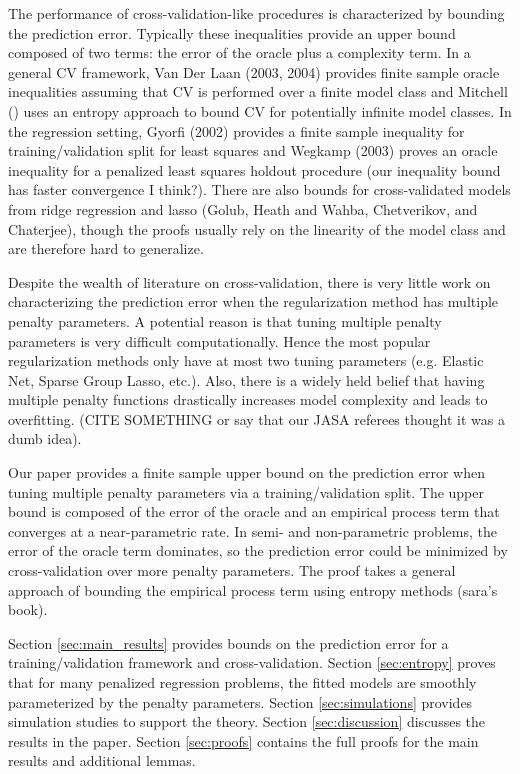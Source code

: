 \documentclass[12pt]{article}
\begin{document}
The performance of cross-validation-like procedures is characterized by bounding the prediction error. Typically these inequalities provide an upper bound composed of two terms: the error of the oracle plus a complexity term. In a general CV framework, Van Der Laan (2003, 2004) provides finite sample oracle inequalities assuming that CV is performed over a finite model class and Mitchell () uses an entropy approach to bound CV for potentially infinite model classes. In the regression setting, Gyorfi (2002) provides a finite sample inequality for training/validation split for least squares and Wegkamp (2003) proves an oracle inequality for a penalized least squares holdout procedure (our inequality bound has faster convergence I think?). There are also bounds for cross-validated models from ridge regression and lasso (Golub, Heath and Wahba, Chetverikov, and Chaterjee), though the proofs usually rely on the linearity of the model class and are therefore hard to generalize.

Despite the wealth of literature on cross-validation, there is very little work on characterizing the prediction error when the regularization method has multiple penalty parameters. A potential reason is that tuning multiple penalty parameters is very difficult computationally. Hence the most popular regularization methods only have at most two tuning parameters (e.g. Elastic Net, Sparse Group Lasso, etc.). Also, there is a widely held belief that having multiple penalty functions drastically increases model complexity and leads to overfitting. (CITE SOMETHING or say that our JASA referees thought it was a dumb idea).

Our paper provides a finite sample upper bound on the prediction error when tuning multiple penalty parameters via a training/validation split. The upper bound is composed of the error of the oracle and an empirical process term that converges at a near-parametric rate. In semi- and non-parametric problems, the error of the oracle term dominates, so the prediction error could be minimized by cross-validation over more penalty parameters. The proof takes a general approach of bounding the empirical process term using entropy methods (sara's book).

Section \ref{sec:main_results} provides bounds on the prediction error for a training/validation framework and cross-validation.
Section \ref{sec:entropy} proves that for many penalized regression problems, the fitted models are smoothly parameterized by the penalty parameters.
Section \ref{sec:simulations} provides simulation studies to support the theory.
Section \ref{sec:discussion} discusses the results in the paper.
Section \ref{sec:proofs} contains the full proofs for the main results and additional lemmas.
\end{document}
